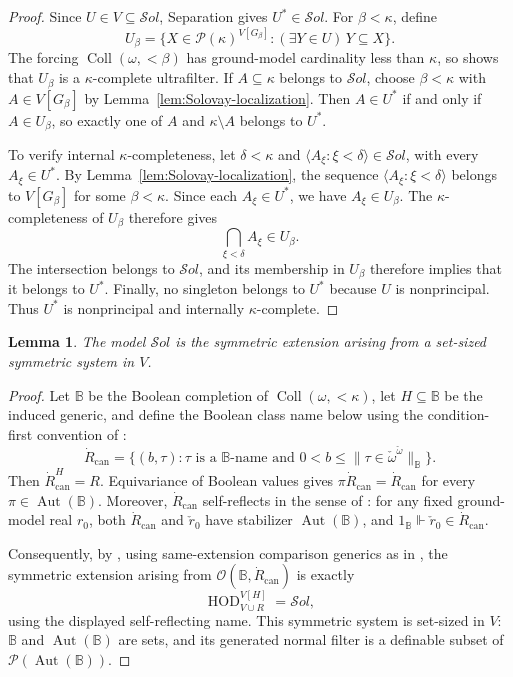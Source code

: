 \documentclass[11pt,a4paper]{amsart}
\newcommand{\HOD}{\operatorname{HOD}}
\newcommand{\Coll}{\operatorname{Coll}}
\newcommand{\Aut}{\operatorname{Aut}}
\theoremstyle{plain}
\newtheorem{lemma}[theorem]{Lemma}
\theoremstyle{definition}
\theoremstyle{remark}
\begin{document}
\begin{proof}
Since $U\in V\subseteq\mathcal S\!ol$, Separation gives $U^*\in\mathcal S\!ol$.  For $\beta<\kappa$, define
\[
U_\beta=\{X\in\mathcal P(\kappa)^{V[G_\beta]}:
(\exists Y\in U)\,Y\subseteq X\}.
\]
The forcing ${\Coll}(\omega,{<}\beta)$ has ground-model cardinality less than $\kappa$, so \cite[Theorem~2.5(2)]{Banerjee} shows that $U_\beta$ is a $\kappa$-complete ultrafilter.  If $A\subseteq\kappa$ belongs to $\mathcal S\!ol$, choose $\beta<\kappa$ with $A\in V[G_\beta]$ by Lemma~\ref{lem:Solovay-localization}.  Then $A\in U^*$ if and only if $A\in U_\beta$, so exactly one of $A$ and $\kappa\setminus A$ belongs to $U^*$.

To verify internal $\kappa$-completeness, let $\delta<\kappa$ and
$\langle A_\xi:\xi<\delta\rangle\in\mathcal S\!ol$, with every
$A_\xi\in U^*$.  By Lemma~\ref{lem:Solovay-localization}, the sequence
$\langle A_\xi:\xi<\delta\rangle$ belongs to $V[G_\beta]$ for some
$\beta<\kappa$.  Since each $A_\xi\in U^*$, we have $A_\xi\in U_\beta$.  The $\kappa$-completeness of $U_\beta$ therefore gives
\[
\bigcap_{\xi<\delta}A_\xi\in U_\beta.
\]
The intersection belongs to $\mathcal S\!ol$, and its membership in $U_\beta$ therefore implies that it belongs to $U^*$.  Finally, no singleton belongs to $U^*$ because $U$ is nonprincipal.  Thus $U^*$ is nonprincipal and internally $\kappa$-complete.
\end{proof}

\begin{lemma}\label{lem:Solovay-symmetric}
The model $\mathcal S\!ol$ is the symmetric extension arising from a set-sized symmetric system in $V$.
\end{lemma}

\begin{proof}
Let $\mathbb B$ be the Boolean completion of ${\Coll}(\omega,{<}\kappa)$, let $H\subseteq\mathbb B$ be the induced generic, and define the Boolean class name below using the condition-first convention of \cite{KaragilaSchilhan}:
\[
\dot R_{\mathrm{can}}=
\{(b,\tau):\tau\text{ is a }\mathbb B\text{-name and }
0<b\leq\|\tau\in\check\omega^{\check\omega}\|_{\mathbb B}\}.
\]
Then $\dot R_{\mathrm{can}}^H=R$.  Equivariance of Boolean values gives
$\pi\dot R_{\mathrm{can}}=\dot R_{\mathrm{can}}$ for every
$\pi\in\Aut(\mathbb B)$.  Moreover, $\dot R_{\mathrm{can}}$ self-reflects in the sense of \cite[Definitions~9.1--9.2]{KaragilaSchilhan}: for any fixed ground-model real $r_0$, both $\dot R_{\mathrm{can}}$ and $\check r_0$ have stabilizer $\Aut(\mathbb B)$, and
$1_{\mathbb B}\Vdash\check r_0\in\dot R_{\mathrm{can}}$.

{\color{auditgreen}Consequently, by \cite[Proposition~9.4]{KaragilaSchilhan}, using same-extension comparison generics as in \cite[Karagila--Schilhan supplement]{RepairNotes}, the symmetric extension arising from}
$\mathcal O(\mathbb B,\dot R_{\mathrm{can}})$ is exactly
\[
\HOD_{V\cup R}^{V[H]}=\mathcal S\!ol,
\]
using the displayed self-reflecting name.  This symmetric system is set-sized in $V$: $\mathbb B$ and $\Aut(\mathbb B)$ are sets, and its generated normal filter is a definable subset of
$\mathcal P(\Aut(\mathbb B))$.
\end{proof}
\end{document}
